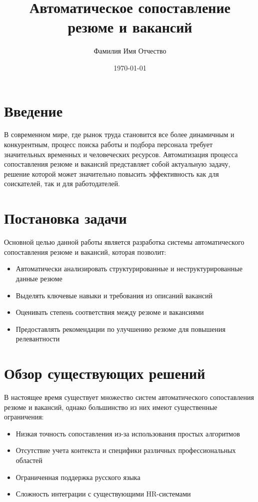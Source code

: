 \documentclass[14pt,a4paper]{article}
\title{Автоматическое сопоставление резюме и вакансий}
\author{Фамилия Имя Отчество}
\date{\today}
\begin{document}
\maketitle

\tableofcontents

\section{Введение}
В современном мире, где рынок труда становится все более динамичным и конкурентным, 
процесс поиска работы и подбора персонала требует значительных временных и человеческих ресурсов. 
Автоматизация процесса сопоставления резюме и вакансий представляет собой актуальную задачу, 
решение которой может значительно повысить эффективность как для соискателей, так и для работодателей.

\section{Постановка задачи}
Основной целью данной работы является разработка системы автоматического сопоставления резюме 
и вакансий, которая позволит:
\begin{itemize}
    \item Автоматически анализировать структурированные и неструктурированные данные резюме
    \item Выделять ключевые навыки и требования из описаний вакансий
    \item Оценивать степень соответствия между резюме и вакансиями
    \item Предоставлять рекомендации по улучшению резюме для повышения релевантности
\end{itemize}

\section{Обзор существующих решений}
В настоящее время существует множество систем автоматического сопоставления резюме и вакансий, 
однако большинство из них имеют существенные ограничения:
\begin{itemize}
    \item Низкая точность сопоставления из-за использования простых алгоритмов
    \item Отсутствие учета контекста и специфики различных профессиональных областей
    \item Ограниченная поддержка русского языка
    \item Сложность интеграции с существующими HR-системами
\end{itemize}
\end{document}

